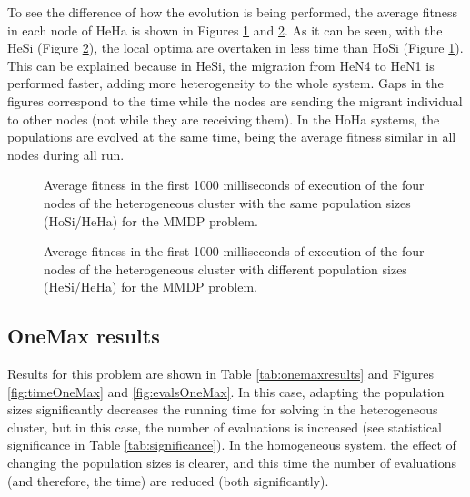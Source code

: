 \documentclass[final,1p,times]{elsarticle}
\begin{document}
To see the difference of how the evolution is being performed, the average fitness in each node of HeHa is shown in Figures \ref{fig:hosiheha} and \ref{fig:hesiheha}. As it can be seen, with the HeSi (Figure \ref{fig:hesiheha}), the local optima are overtaken in less time than HoSi (Figure \ref{fig:hosiheha}).  This can be explained because in HeSi, the migration from HeN4 to HeN1 is performed faster, adding more heterogeneity to the whole system. Gaps in the figures correspond to the time while the nodes are sending the migrant individual to other nodes (not while they are receiving them). In the HoHa systems, the populations are evolved at the same time, being the average fitness similar in all nodes during all run. %


\begin{figure}[htb]
\centering
{}
\caption{Average fitness in the first 1000 milliseconds of execution of the four nodes of the heterogeneous cluster with the same population sizes (HoSi/HeHa) for the MMDP problem.}
\label{fig:hosiheha}
\end{figure}

\begin{figure}[htb]
\centering
{} %
\caption{Average fitness in the first 1000 milliseconds of execution of the four nodes of the heterogeneous cluster with different population sizes (HeSi/HeHa) for the MMDP problem.}
\label{fig:hesiheha}
\end{figure}



\subsection{OneMax results}

Results for this problem are shown in Table \ref{tab:onemaxresults} and Figures  \ref{fig:timeOneMax} and \ref{fig:evalsOneMax}. In this case, adapting the population sizes significantly decreases  the running time for solving in the heterogeneous cluster, but in this case, the number of evaluations is increased (see statistical significance in Table \ref{tab:significance}). In the homogeneous system, the effect of changing the population sizes is clearer, and this time the number of evaluations (and therefore, the time) are reduced (both significantly). 
\end{document}
